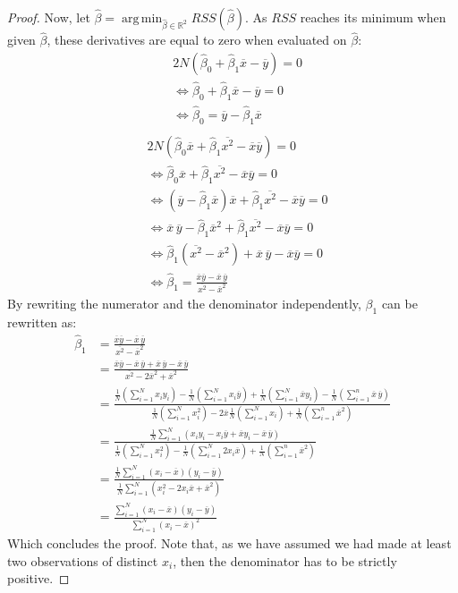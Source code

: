 \documentclass{article}
\theoremstyle{definition}
\theoremstyle{remark}
\theoremstyle{example}
\DeclareMathOperator*{\argmin}{arg\,min}
\newcommand{\betat}{\hat{\beta}}
\newcommand{\mx}{\overline{x}}
\newcommand{\my}{\overline{y}}
\newcommand{\mxy}{\overline{x}\overline{y}}
\newcommand{\mxsquare}{\overline{x^2}}
\begin{document}
\begin{proof}
		Now, let $\betat = \argmin_{\betat \in \mathbb{R}^2} RSS(\betat)$. As $RSS$ reaches its minimum when given $\betat$, these derivatives are equal to zero when evaluated on $\betat$:
		\begin{align*}
				&2N(\betat_0 + \betat_1 \mx - \my) = 0\\
				&\iff \betat_0 + \betat_1 \mx - \my = 0\\
				&\iff \betat_0 = \my - \betat_1 \mx\\
		\end{align*}
		\begin{align*}
				&2N(\betat_0 \mx + \betat_1 \mxsquare - \mxy) = 0\\
				&\iff \betat_0 \mx + \betat_1 \mxsquare - \mxy = 0\\
				&\iff (\my - \betat_1 \mx) \mx + \betat_1 \mxsquare - \mxy = 0\\
				&\iff \mx\,\my - \betat_1 \mx^2 + \betat_1 \mxsquare - \mxy = 0\\
				&\iff \betat_1 (\mxsquare - \mx^2) + \mx\,\my - \mxy = 0\\
				&\iff \betat_1 = \frac{\mxy - \mx\,\my}{\mxsquare - \mx^2}
		\end{align*}
		By rewriting the numerator and the denominator independently, $\beta_1$ can be rewritten as:
		\begin{align*}
				\betat_1 &= \frac{\mxy - \mx\,\my}{\mxsquare - \mx^2}\\
						 &= \frac{\mxy - \mx\,\my + \mx\,\my - \mx\,\my}{\mxsquare - 2\mx^2 + \mx^2}\\
						 &= \frac{\frac{1}{N} (\sum_{i=1}^N x_i y_i) - \frac{1}{N} (\sum_{i=1}^N x_i \my) + \frac{1}{N} (\sum_{i=1}^N \mx y_i) - \frac{1}{N} (\sum_{i=1}^n \mx\,\my)}{\frac{1}{N}(\sum_{i=1}^N x_i^2) - 2\mx\frac{1}{N}(\sum_{i=1}^N x_i) + \frac{1}{N}(\sum_{i=1}^n \mx^2)}\\
						 &= \frac{\frac{1}{N} \sum_{i=1}^N (x_i y_i - x_i \my + \mx y_i - \mx\,\my)}{\frac{1}{N}(\sum_{i=1}^N x_i^2) - \frac{1}{N} (\sum_{i=1}^N 2 x_i \mx) + \frac{1}{N}(\sum_{i=1}^n \mx^2)}\\
						 &= \frac{\frac{1}{N} \sum_{i=1}^N (x_i - \mx)(y_i - \my)}{\frac{1}{N} \sum_{i=1}^N (x_i^2 - 2 x_i \mx + \mx^2)}\\
						 &= \frac{\sum_{i=1}^N (x_i - \mx)(y_i - \my)}{\sum_{i=1}^N (x_i - \mx)^2}
		\end{align*}
		Which concludes the proof. Note that, as we have assumed we had made at least two observations of distinct $x_i$, then the denominator has to be strictly positive.
\end{proof}
\end{document}
